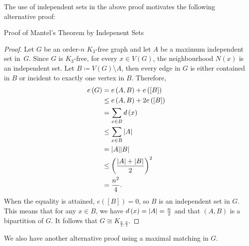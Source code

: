 \documentclass[math]{amznotes}
\theoremstyle{remark}
\begin{document}
The use of independent sets in the above proof motivates the following alternative proof:
\begin{genbox}{Proof of Mantel's Theorem by Indepenent Sets}
    \begin{proof}
        Let $G$ be an order-$n$ $K_3$-free graph and let $A$ be a maximum independent set in~$G$. Since $G$ is $K_3$-free, for every $x \in V\left(G\right)$, the neighbourhood $N\left(x\right)$ is an independent set. Let $B \coloneqq V\left(G\right) \setminus A$, then every edge in $G$ is either contained in $B$ or incident to exactly one vertex in $B$. Therefore, 
        \begin{align*}
            e\left(G\right) & = e\left(A, B\right) + e\left(\left[B\right]\right) \\
            & \leq e\left(A, B\right) + 2e\left(\left[B\right]\right) \\
            & = \sum_{x \in B}d\left(x\right) \\
            & \leq \sum_{x \in B}{\left\lvert {A} \right\rvert} \\
            & = {\left\lvert {A} \right\rvert}{\left\lvert {B} \right\rvert} \\
            & \leq \left(\frac{{\left\lvert {A} \right\rvert} + {\left\lvert {B} \right\rvert}}{2}\right)^2 \\
            & = \frac{n^2}{4}.
        \end{align*}
        When the equality is attained, $e\left(\left[B\right]\right) = 0$, so $B$ is an independent set in $G$. This means that for any $x \in B$, we have $d\left(x\right) = {\left\lvert {A} \right\rvert} = \frac{n}{2}$ and that $\left(A, B\right)$ is a bipartition of $G$. It follows that $G \cong K_{\frac{n}{2}, \frac{n}{2}}$.
    \end{proof}
\end{genbox} 
We also have another alternative proof using a maximal matching in $G$.
\end{document}
